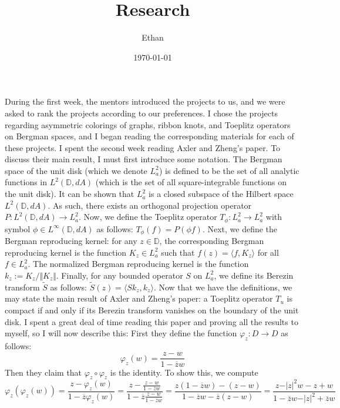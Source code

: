 \documentclass[12pt]{article}
\begin{document}
 
\title{Research}
\author{Ethan}
\date{\today}
\maketitle
{}
\hfuzz=50pt
\noindent
During the first week, the mentors introduced the projects to us, and we were asked to rank the projects according to our preferences. I chose the projects regarding asymmetric colorings of graphs, ribbon knots, and Toeplitz operators on Bergman spaces, and I began reading the corresponding materials for each of these projects. I spent the second week reading Axler and Zheng's paper. To discuss their main result, I must first introduce some notation. The Bergman space of the unit disk (which we denote $L_a^2$) is defined to be the set of all analytic functions in $L^2(\mathbb{D},dA)$ (which is the set of all square-integrable functions on the unit disk). It can be shown that $L_a^2$ is a closed subspace of the Hilbert space $L^2(\mathbb{D},dA)$. As such, there exists an orthogonal projection operator $P: L^2(\mathbb{D},dA) \rightarrow L_a^2$. Now, we define the Toeplitz operator $T_\phi: L_a^2 \rightarrow L_a^2$ with symbol $\phi \in L^\infty(\mathbb{D},dA)$ as follows: $T_\phi(f) = P(\phi f)$. Next, we define the Bergman reproducing kernel: for any $z \in \mathbb{D}$, the corresponding Bergman reproducing kernel is the function $K_z \in L_a^2$ such that $f(z) = \langle f, K_z \rangle$ for all $f \in L_a^2$. The normalized Bergman reproducing kernel is the function $k_z := K_z/\Vert K_z \Vert$. Finally, for any bounded operator $S$ on $L_a^2$, we define its Berezin transform $\tilde{S}$ as follows: $\tilde{S}(z) = \langle Sk_z, k_z \rangle$. Now that we have the definitions, we may state the main result of Axler and Zheng's paper: a Toeplitz operator $T_u$ is compact if and only if its Berezin transform vanishes on the boundary of the unit disk. I spent a great deal of time reading this paper and proving all the results to myself, so I will now describe this: First they define the function $\varphi_z: D \rightarrow D$ as follows:
\[
\varphi_z(w) = \frac{z-w}{1-\overline{z}w}
\] Then they claim that $\varphi_z \circ \varphi_z$ is the identity. To show this, we compute
\[
\varphi_z(\varphi_z(w)) = \frac{z-\varphi_z(w)}{1-\overline{z}\varphi_z(w)} = \frac{z-\frac{z-w}{1-\overline{z}w}}{1-\overline{z}\frac{z-w}{1-\overline{z}w}} = \frac{z(1-\overline{z}w) - (z-w)}{1-\overline{z}w - \overline{z}(z-w)} = \frac{z - \vert z \vert^2 w - z + w}{1 - \overline{z}w - \vert z \vert^2+ \overline{z}w}
\]
\end{document}
